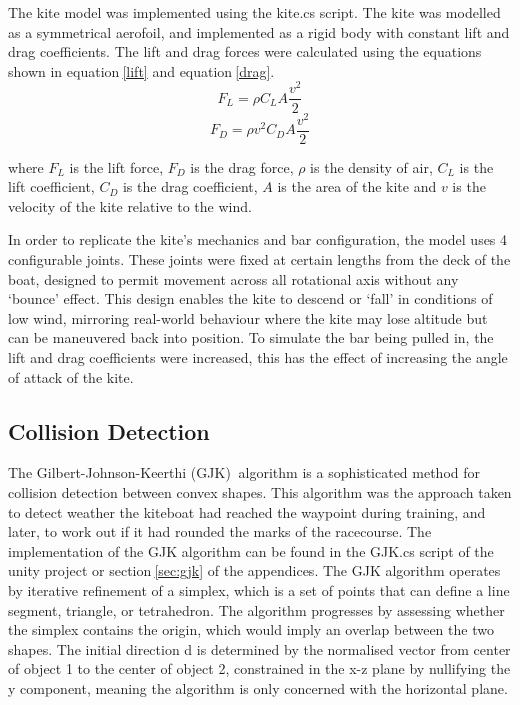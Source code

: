 The kite model was implemented using the kite.cs script. The kite was modelled as a symmetrical aerofoil, and implemented as a rigid body with constant lift and drag coefficients. The lift and drag forces were calculated using the equations shown in equation$~$\ref{lift} and equation$~$\ref{drag}.
\begin{equation}
    F_L = \rho C_L A \frac{v^2}{2} 
    \label{lift}
\end{equation}
\begin{equation}
    F_D = \rho v^2 C_D A \frac{v^2}{2} 
    \label{drag}
\end{equation}

where $F_L$ is the lift force, $F_D$ is the drag force, $\rho$ is the density of air, $C_L$ is the lift coefficient, $C_D$ is the drag coefficient, $A$ is the area of the kite and $v$ is the velocity of the kite relative to the wind.

In order to replicate the kite's mechanics and bar configuration, the model uses 4 configurable joints. These joints were fixed at certain lengths from the deck of the boat, designed to permit movement across all rotational axis without any `bounce' effect. This design enables the kite to descend or `fall' in conditions of low wind, mirroring real-world behaviour where the kite may lose altitude but can be maneuvered back into position. To simulate the bar being pulled in, the lift and drag coefficients were increased, this has the effect of increasing the angle of attack of the kite.


\subsection{Collision Detection}
The Gilbert-Johnson-Keerthi (GJK)$~$\cite{gilbert88gjk} algorithm is a sophisticated method for collision detection between convex shapes. This algorithm was the approach taken to detect weather the kiteboat had reached the waypoint during training, and later, to work out if it had rounded the marks of the racecourse. The implementation of the GJK algorithm can be found in the GJK.cs script of the unity project or section$~$\ref{sec:gjk} of the appendices.
The GJK algorithm operates by iterative refinement of a simplex, which is a set of points that can define a line segment, triangle, or tetrahedron. The algorithm progresses by assessing whether the simplex contains the origin, which would imply an overlap between the two shapes. The initial direction d is determined by the normalised vector from center of object 1 to the center of object 2, constrained in the x-z plane by nullifying the y component, meaning the algorithm is only concerned with the horizontal plane.  

